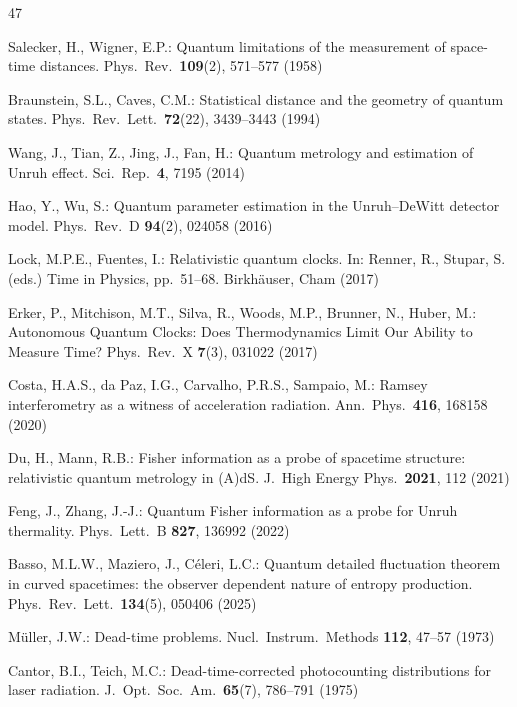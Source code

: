 \begin{thebibliography}{47}

Salecker, H., Wigner, E.P.:
Quantum limitations of the measurement of space-time distances.
Phys.\ Rev.\ \textbf{109}(2), 571--577 (1958)

Braunstein, S.L., Caves, C.M.:
Statistical distance and the geometry of quantum states.
Phys.\ Rev.\ Lett.\ \textbf{72}(22), 3439--3443 (1994)

Wang, J., Tian, Z., Jing, J., Fan, H.:
Quantum metrology and estimation of Unruh effect.
Sci.\ Rep.\ \textbf{4}, 7195 (2014)

Hao, Y., Wu, S.:
Quantum parameter estimation in the Unruh--DeWitt detector model.
Phys.\ Rev.\ D \textbf{94}(2), 024058 (2016)

Lock, M.P.E., Fuentes, I.:
Relativistic quantum clocks.
In: Renner, R., Stupar, S. (eds.)
Time in Physics, pp.~51--68.
Birkh\"auser, Cham (2017)

Erker, P., Mitchison, M.T., Silva, R., Woods, M.P., Brunner, N., Huber, M.:
Autonomous Quantum Clocks: Does Thermodynamics Limit Our Ability to Measure Time?
Phys.\ Rev.\ X \textbf{7}(3), 031022 (2017)

Costa, H.A.S., da Paz, I.G., Carvalho, P.R.S., Sampaio, M.:
Ramsey interferometry as a witness of acceleration radiation.
Ann.\ Phys.\ \textbf{416}, 168158 (2020)

Du, H., Mann, R.B.:
Fisher information as a probe of spacetime structure: relativistic quantum metrology in (A)dS.
J.\ High Energy Phys.\ \textbf{2021}, 112 (2021)

Feng, J., Zhang, J.-J.:
Quantum Fisher information as a probe for Unruh thermality.
Phys.\ Lett.\ B \textbf{827}, 136992 (2022)

Basso, M.L.W., Maziero, J., C\'eleri, L.C.:
Quantum detailed fluctuation theorem in curved spacetimes: the observer dependent nature of entropy production.
Phys.\ Rev.\ Lett.\ \textbf{134}(5), 050406 (2025)


M\"uller, J.W.:
Dead-time problems.
Nucl.\ Instrum.\ Methods \textbf{112}, 47--57 (1973)

Cantor, B.I., Teich, M.C.:
Dead-time-corrected photocounting distributions for laser radiation.
J.\ Opt.\ Soc.\ Am.\ \textbf{65}(7), 786--791 (1975)


\end{thebibliography}

